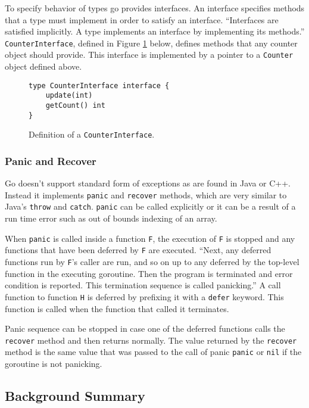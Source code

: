 \documentclass[12pt,a4paper]{article}
\begin{document}
To specify behavior of types go provides interfaces. An interface
specifies methods that a type must implement in order to satisfy an 
interface. ``Interfaces are satisfied implicitly. A type implements 
an interface by implementing its methods.'' \cite{tour}
\texttt{CounterInterface}, defined in Figure \ref{fig:counterInter} below,
defines methods that any counter object should provide. This interface 
is implemented by a pointer to a \texttt{Counter} object defined above.

\begin{figure}[h]
\centering
\begin{lstlisting}
type CounterInterface interface {
    update(int)
    getCount() int
}
\end{lstlisting}
\caption[scale=1.0]{Definition of a \texttt{CounterInterface}.}
\label{fig:counterInter}
\end{figure}

\subsubsection{Panic and Recover}
Go doesn't support standard form of exceptions as are found in Java or
C++. Instead it implements \texttt{panic} and \texttt{recover} methods, 
which are very similar to Java's \texttt{throw} and \texttt{catch}.
\texttt{panic} can be called explicitly or it can be a result of 
a run time error such as out of bounds indexing of an array.

When \texttt{panic} is called inside a function \texttt{F}, the execution
of \texttt{F} is stopped and any functions that have been deferred by
\texttt{F} are executed. ``Next, any deferred functions run by \texttt{F}'s caller 
are run, and so on up to any deferred by the top-level function in the executing 
goroutine. Then the program is terminated and error condition 
is reported. This termination sequence is called panicking.'' \cite{goSpec}
A call function to function \texttt{H} is deferred by prefixing it with a 
\texttt{defer} keyword. This function is called when the function that 
called it terminates.

Panic sequence can be stopped in case one of the deferred functions
calls the \texttt{recover} method and then returns normally. The value
returned by the \texttt{recover} method is the same value that was passed
to the call of panic \texttt{panic} or \texttt{nil} if the goroutine
is not panicking. \cite{goSpec}

\subsection{Background Summary}
\end{document}
